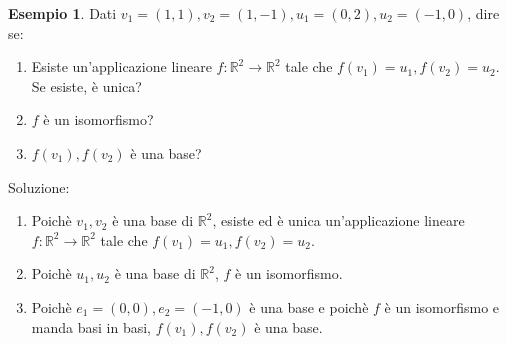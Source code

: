 \documentclass[a4paper]{article}
\theoremstyle{definition}
\newtheorem*{es}{Esempio}
\begin{document}
\begin{es}
	Dati $v_1 = (1, 1), v_2 = (1, -1), u_1 = (0, 2), u_2 = (-1, 0)$, dire se:
	\begin{enumerate}
		\item Esiste un'applicazione lineare $f: \mathbb{R}^2 \rightarrow \mathbb{R}^2$ tale che $f(v_1) = u_1, f(v_2) = u_2$. Se esiste, è unica?
		\item $f$ è un isomorfismo?
		\item $f(v_1), f(v_2)$ è una base?
	\end{enumerate}
	Soluzione:
	\begin{enumerate}
		\item Poichè $v_1, v_2$ è una base di $\mathbb{R}^2$, esiste ed è unica un'applicazione lineare $f: \mathbb{R}^2 \rightarrow \mathbb{R}^2$ tale che $f(v_1) = u_1, f(v_2) = u_2$.
		\item Poichè $u_1, u_2$ è una base di $\mathbb{R}^2$, $f$ è un isomorfismo.
		\item Poichè $e_1 = (0, 0), e_2 = (-1, 0)$ è una base e poichè $f$ è un isomorfismo e manda basi in basi, $f(v_1), f(v_2)$ è una base.
	\end{enumerate}
\end{es}
\end{document}
